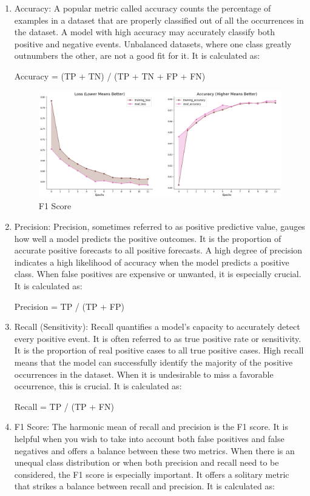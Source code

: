 \documentclass[12pt,a4paper]{report}     %
\begin{document}
\begin{normalsize}
{{{\begin{enumerate}

\item Accuracy: A popular metric called accuracy counts the percentage of examples in a dataset that are properly classified out of all the occurrences in the dataset. A model with high accuracy may accurately classify both positive and negative events. Unbalanced datasets, where one class greatly outnumbers the other, are not a good fit for it. It is calculated as:

Accuracy = (TP + TN) / (TP + TN + FP + FN)

\begin{figure}[h]
    \centering
    \includegraphics[width=11cm]{training_curves.png}
    \caption{F1 Score}
    \label{fig: sequence diagram}
\end{figure}

\newpage
\item Precision:  Precision, sometimes referred to as positive predictive value, gauges how well a model predicts the positive outcomes. It is the proportion of accurate positive forecasts to all positive forecasts. A high degree of precision indicates a high likelihood of accuracy when the model predicts a positive class. When false positives are expensive or unwanted, it is especially crucial. It is calculated as:

Precision = TP / (TP + FP)

\item Recall (Sensitivity): Recall quantifies a model's capacity to accurately detect every positive event. It is often referred to as true positive rate or sensitivity. It is the proportion of real positive cases to all true positive cases. High recall means that the model can successfully identify the majority of the positive occurrences in the dataset. When it is undesirable to miss a favorable occurrence, this is crucial. It is calculated as:

Recall = TP / (TP + FN)

\item F1 Score: The harmonic mean of recall and precision is the F1 score. It is helpful when you wish to take into account both false positives and false negatives and offers a balance between these two metrics. When there is an unequal class distribution or when both precision and recall need to be considered, the F1 score is especially important. It offers a solitary metric that strikes a balance between recall and precision. It is calculated as:


\end{enumerate}}}}
\end{normalsize}
\end{document}
